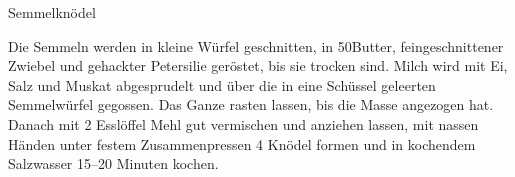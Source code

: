 \begin{recipe}{Semmelknödel}%

    \begin{ingredients}
    \end{ingredients}

    \begin{instructions}
        Die Semmeln werden in kleine Würfel geschnitten, in 50\gram Butter, feingeschnittener Zwiebel und gehackter Petersilie geröstet, bis sie trocken sind.
        Milch wird mit Ei, Salz und Muskat abgesprudelt und über die in eine Schüssel geleerten Semmelwürfel gegossen.
        Das Ganze rasten lassen, bis die Masse angezogen hat.
        Danach mit 2 Esslöffel Mehl gut vermischen und anziehen lassen, mit nassen Händen unter festem Zusammenpressen 4 Knödel formen und in kochendem Salzwasser 15--20 Minuten kochen.
    \end{instructions}
\end{recipe}
